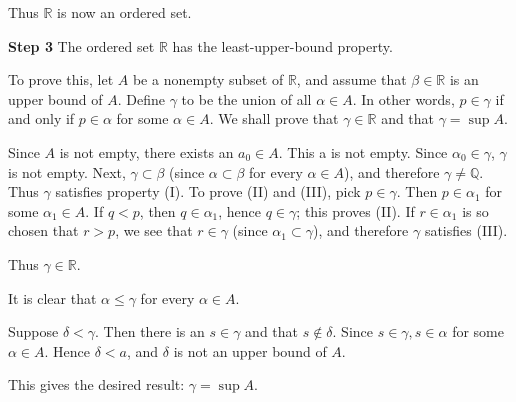 Thus $\mathbb{R}$ is now an ordered set.


\textbf{Step 3}
The ordered set $\mathbb{R}$ has the least-upper-bound property.

To prove this, let $A$ be a nonempty subset of $\mathbb{R}$, and assume that $\beta \in \mathbb{R}$ is an upper bound of $A$. Define $\gamma$ to be the union of all $\alpha \in A$. In other words, $p\in \gamma$ if and only if $p \in \alpha$ for some $\alpha \in A$. We shall prove that $\gamma \in \mathbb{R}$ and that $\gamma = \sup A$.

Since $A$ is not empty, there exists an $a_0 \in A$. This a is not empty. Since $\alpha_0 \in \gamma$, $\gamma$ is not empty. Next, $\gamma \subset \beta$ (since $\alpha \subset \beta$ for every $\alpha \in A$), and therefore $\gamma \neq \mathbb{Q}$. Thus $\gamma$ satisfies property (I). To prove (II) and (III), pick $p \in \gamma$. Then $p \in \alpha_1$ for some $\alpha_1 \in A$. If $q <p$, then $q \in \alpha_1$, hence $q \in \gamma$; this proves (II). If $r \in \alpha_1$ is so chosen that $r > p$, we see that $r\in \gamma$ (since $\alpha_1 \subset \gamma$), and therefore $\gamma$
satisfies (III).

Thus $\gamma \in \mathbb{R}$.

It is clear that $\alpha \leq \gamma$ for every $\alpha \in A$.

Suppose $\delta < \gamma$. Then there is an $s \in \gamma$ and that $s \not\in \delta$. Since $s \in \gamma, s \in \alpha$
for some $\alpha \in A$. Hence $\delta <a$, and $\delta$ is not an upper bound of $A$.

This gives the desired result: $\gamma = \sup A$.

